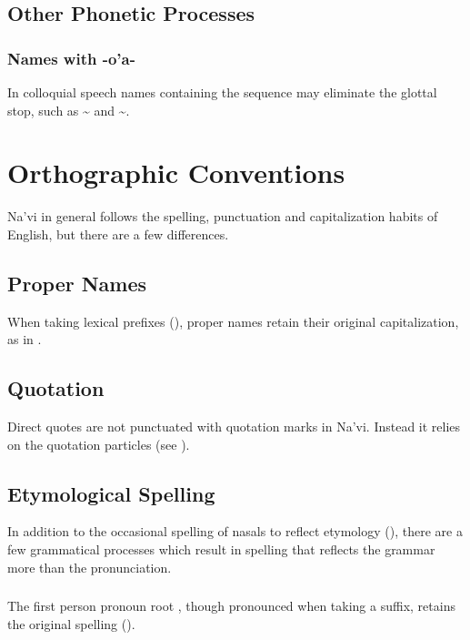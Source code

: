 \subsection{Other Phonetic Processes}

\subsubsection{Names with -o'a-} In colloquial speech names containing
the sequence  may eliminate the glottal stop, such
as  \textasciitilde{} 
and  \textasciitilde {}.


\section{Orthographic Conventions}
\noindent Na'vi in general follows the spelling, punctuation and
capitalization habits of English, but there are a few differences.

\subsection{Proper Names} When taking lexical prefixes
(), proper names retain their original
capitalization, as in .

\subsection{Quotation} Direct quotes are not punctuated with quotation
marks in Na'vi.  Instead it relies on the quotation particles
 (see ).

\subsection{Etymological Spelling} In addition to the occasional
spelling of nasals to reflect etymo\-logy (),
there are a few grammatical processes which result in spelling that
reflects the grammar more than the pronunciation.

\subsubsection{} The first person pronoun root , though
pronounced  when taking a suffix, retains the original spelling
().

